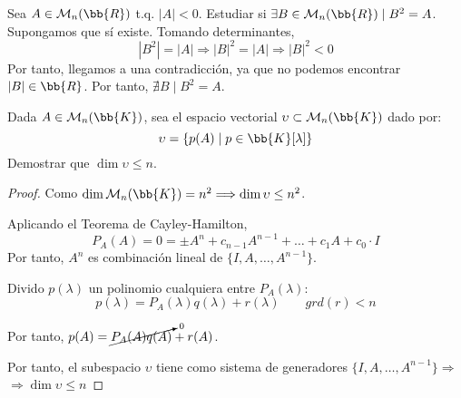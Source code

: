 \begin{ejercicio}
    Sea $A \in \mathcal{M}_n(\bb{R})$ t.q. $|A|<0$. Estudiar si $\exists B\in \mathcal{M}_n(\bb{R}) \mid B^2=A$.\\

    Supongamos que sí existe. Tomando determinantes,
    $$|B^2| = |A| \Longrightarrow |B|^2 = |A| \Longrightarrow |B|^2 < 0$$
    Por tanto, llegamos a una contradicción, ya que no podemos encontrar $|B|\in \bb{R}$. Por tanto, $\nexists B \mid B^2=A$.
\end{ejercicio}

\begin{ejercicio}
    Dada $A\in \mathcal{M}_n(\bb{K})$, sea el espacio vectorial $\upsilon \subset \mathcal{M}_n(\bb{K})$ dado por:
    $$\upsilon = \left\{ p(A) \mid p\in \bb{K}[\lambda]\right\}$$
    Demostrar que $\dim \upsilon \leq n$.
    \begin{proof}
        Como $\dim \mathcal{M}_n(\bb{K}) = n^2 \Longrightarrow \dim \upsilon \leq n^2$.

        Aplicando el Teorema de Cayley-Hamilton,
        $$P_A(A) = 0 = \pm A^n + c_{n-1}A^{n-1} + \dots + c_1A + c_0\cdot I$$
        Por tanto, $A^n$ es combinación lineal de $\{I, A,\dots, A^{n-1}\}$.
    
        Divido $p(\lambda)$ un polinomio cualquiera entre $P_A(\lambda)$:
        $$p(\lambda) = P_A(\lambda)q(\lambda) + r(\lambda)\qquad grd(r)<n$$
    
        Por tanto, $p(A) = \cancelto{0}{P_A(A)q(A)} + r(A)$.
    
        Por tanto, el subespacio $\upsilon$ tiene como sistema de generadores $\{I, A, \dots, A^{n-1}\} \Longrightarrow$
        $\Longrightarrow \dim \upsilon \leq n$
    \end{proof}
\end{ejercicio}

